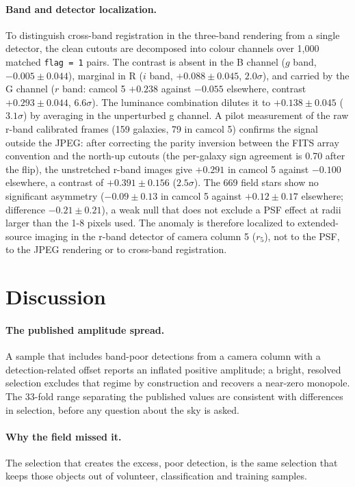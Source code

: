 \documentclass[11pt]{article}
\begin{document}
\paragraph{Band and detector localization.} To distinguish cross-band registration in the three-band
rendering from a single detector, the clean cutouts are decomposed into colour channels over 1,000
matched \texttt{flag = 1} pairs. The contrast is absent in the B channel ($g$ band, $-0.005 \pm 0.044$),
marginal in R ($i$ band, $+0.088 \pm 0.045$, $2.0\sigma$), and carried by the G channel ($r$ band:
camcol 5 $+0.238$ against $-0.055$ elsewhere, contrast $+0.293 \pm 0.044$, $6.6\sigma$). The luminance
combination dilutes it to $+0.138 \pm 0.045$ ($3.1\sigma$) by averaging in the unperturbed g channel.
A pilot measurement of the raw r-band calibrated frames (159 galaxies, 79 in camcol 5) confirms the
signal outside the JPEG: after correcting the parity inversion between the FITS array convention
and the north-up cutouts (the per-galaxy sign agreement is 0.70 after the flip), the unstretched
r-band images give $+0.291$ in camcol 5 against $-0.100$ elsewhere, a contrast of
$+0.391 \pm 0.156$ ($2.5\sigma$). The 669 field stars show no significant asymmetry ($-0.09 \pm 0.13$ in
camcol 5 against $+0.12 \pm 0.17$ elsewhere; difference $-0.21 \pm 0.21$), a weak null that does not
exclude a PSF effect at radii larger than the 1-8 pixels used. The anomaly is therefore
localized to extended-source imaging in the r-band detector of camera column 5 ($r_5$), not to the
PSF, to the JPEG rendering or to cross-band registration.

\section{Discussion}
\paragraph{The published amplitude spread.} A sample that includes band-poor detections from a
camera column with a detection-related offset reports an inflated positive amplitude; a bright,
resolved selection excludes that regime by construction and recovers a near-zero monopole. The 33-fold range separating the published values are consistent with differences in selection,
before any question about the sky is asked.

\paragraph{Why the field missed it.} The selection that creates the excess, poor detection, is the
same selection that keeps those objects out of volunteer, classification and training samples.
\end{document}
